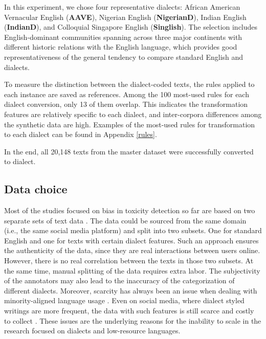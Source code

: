 \documentclass[11pt]{article}
\begin{document}
In this experiment, we chose four representative dialects: African American Vernacular English (\textbf{AAVE}), Nigerian English (\textbf{NigerianD}), Indian English (\textbf{IndianD}), and Colloquial Singapore English (\textbf{Singlish}). The selection includes English-dominant communities spanning across three major continents with different historic relations with the English language, which provides good representativeness of the general tendency to compare standard English and dialects.

To measure the distinction between the dialect-coded texts, the rules applied to each instance are saved as references. Among the 100 most-used rules for each dialect conversion, only 13 of them overlap. This indicates the transformation features are relatively specific to each dialect, and inter-corpora differences among the synthetic data are high. Examples of the most-used rules for transformation to each dialect can be found in Appendix \ref{rules}.

In the end, all 20,148 texts from the master dataset were successfully converted to dialect.

\subsection{Data choice}

Most of the studies focused on bias in toxicity detection so far are based on two separate sets of text data \citep{sap-etal-2019-risk, davidson-etal-2019-racial, ball-2021-differential, zhou-etal-2021-challenges}. The data could be sourced from the same domain (i.e., the same social media platform) and split into two subsets. One for standard English and one for texts with certain dialect features. Such an approach ensures the authenticity of the data, since they are real interactions between users online. However, there is no real correlation between the texts in those two subsets. At the same time, manual splitting of the data requires extra labor. The subjectivity of the annotators may also lead to the inaccuracy of the categorization of different dialects. Moreover, scarcity has always been an issue when dealing with minority-aligned language usage \citep{dash-2019-scarcity}. Even on social media, where dialect styled writings are more frequent, the data with such features is still scarce and costly to collect \citep{jorgensen-2015-challenges}. These issues are the underlying reasons for the inability to scale in the research focused on dialects and low-resource languages.
\end{document}
